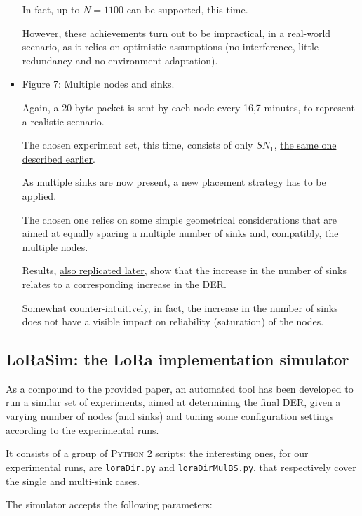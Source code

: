 \documentclass[a4paper,11pt]{article} %
\begin{document}
\begin{itemize}
        In fact, up to $N = 1100$ can be supported, this time.

        However, these achievements turn out to be impractical, in a real-world scenario, as it relies on optimistic assumptions (no interference, little redundancy and no environment adaptation).
        \item Figure 7: Multiple nodes and sinks.

        Again, a 20-byte packet is sent by each node every 16,7 minutes, to represent a realistic scenario.

        The chosen experiment set, this time, consists of only $SN_1$, \hyperref[description-sn1]{the same one described earlier}.

        As multiple sinks are now present, a new placement strategy has to be applied.

        The chosen one relies on some simple geometrical considerations that are aimed at equally spacing a multiple number of sinks and, compatibly, the multiple nodes.

        Results, \hyperref[subsec:experimental-results]{also replicated later}, show that the increase in the number of sinks relates to a corresponding increase in the \textsc{DER}.

        Somewhat counter-intuitively, in fact, the increase in the number of sinks does not have a visible impact on reliability (saturation) of the nodes.
    \end{itemize}

    \subsection{LoRaSim: the LoRa implementation simulator}\label{subsec:lorasim:-the-lora-implementation-simulator}

    As a compound to the provided paper, an automated tool has been developed to run a similar set of experiments, aimed at determining the final DER, given a varying number of nodes (and sinks) and tuning some configuration settings according to the experimental runs.

    \smallskip

    It consists of a group of \textsc{Python 2} scripts: the interesting ones, for our experimental runs, are \texttt{loraDir.py} and \texttt{loraDirMulBS.py}, that respectively cover the single and multi-sink cases.

    \smallskip

    The simulator accepts the following parameters:
\end{document}
